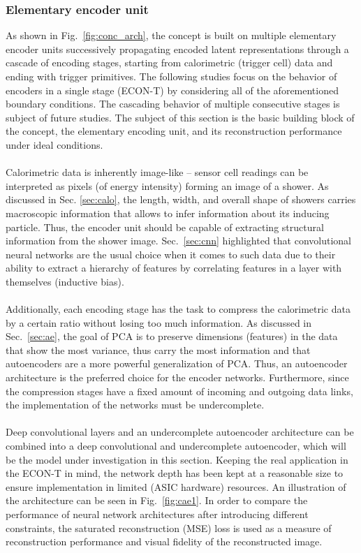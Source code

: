 \documentclass[../../main.tex]{subfiles}
\begin{document}
\subsubsection{Elementary encoder unit}\label{sec:generic_enc}
As shown in Fig.~\ref{fig:conc_arch}, the concept is built on multiple elementary encoder units successively propagating encoded latent representations through a cascade of encoding stages, starting from calorimetric (trigger cell) data and ending with trigger primitives. The following studies focus on the behavior of encoders in a single stage (ECON-T) by considering all of the aforementioned boundary conditions. The cascading behavior of multiple consecutive stages is subject of future studies. The subject of this section is the basic building block of the concept, the elementary encoding unit, and its reconstruction performance under ideal conditions.\\
\\
Calorimetric data is inherently image-like -- sensor cell readings can be interpreted as pixels (of energy intensity) forming an image of a shower. As discussed in Sec. \ref{sec:calo}, the length, width, and overall shape of showers carries macroscopic information that allows to infer information about its inducing particle. Thus, the encoder unit should be capable of extracting structural information from the shower image. Sec.~\ref{sec:cnn} highlighted that convolutional neural networks are the usual choice when it comes to such data due to their ability to extract a hierarchy of features by correlating features in a layer with themselves (inductive bias).\\
\\
Additionally, each encoding stage has the task to compress the calorimetric data by a certain ratio without losing too much information. As discussed in Sec.~\ref{sec:ae}, the goal of PCA is to preserve dimensions (features) in the data that show the most variance, thus carry the most information and that autoencoders are a more powerful generalization of PCA. Thus, an autoencoder architecture is the preferred choice for the encoder networks. Furthermore, since the compression stages have a fixed amount of incoming and outgoing data links, the implementation of the networks must be undercomplete.\\
\\
Deep convolutional layers and an undercomplete autoencoder architecture can be combined into a deep convolutional and undercomplete autoencoder, which will be the model under investigation in this section. Keeping the real application in the ECON-T in mind, the network depth has been kept at a reasonable size to ensure implementation in limited (ASIC hardware) resources. An illustration of the architecture can be seen in Fig.~\ref{fig:cae1}. In order to compare the performance of neural network architectures after introducing different constraints, the saturated reconstruction (MSE) loss is used as a measure of reconstruction performance and visual fidelity of the reconstructed image.\\
\end{document}
